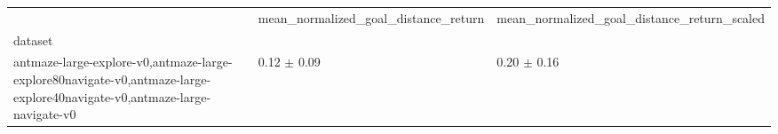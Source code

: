\begin{tabular}{lll}
\toprule
 & mean_normalized_goal_distance_return & mean_normalized_goal_distance_return_scaled \\
dataset &  &  \\
\midrule
antmaze-large-explore-v0,antmaze-large-explore80navigate-v0,antmaze-large-explore40navigate-v0,antmaze-large-navigate-v0 & 0.12 $\pm$ 0.09 & 0.20 $\pm$ 0.16 \\
\bottomrule
\end{tabular}
